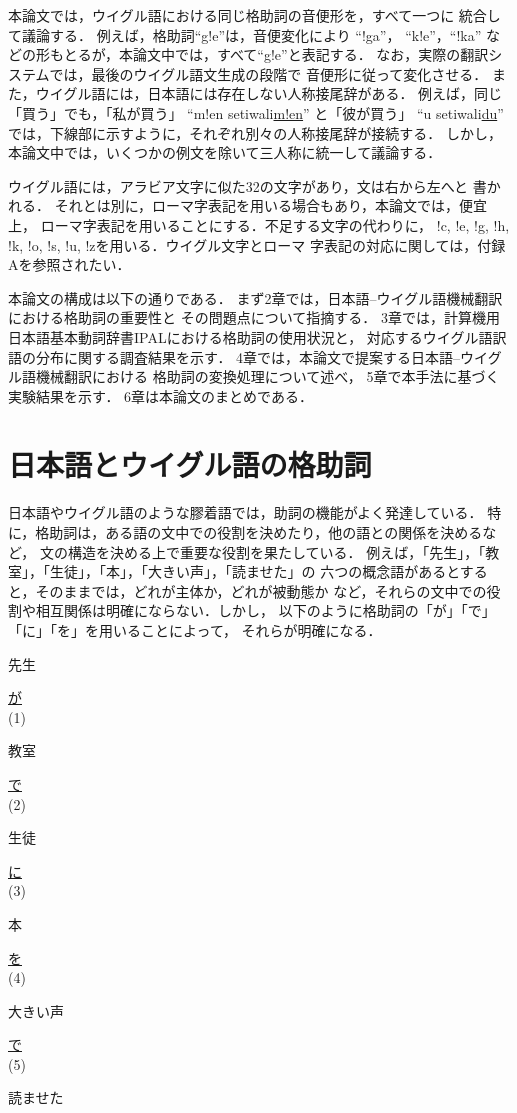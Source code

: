 本論文では，ウイグル語における同じ格助詞の音便形を，すべて一つに
統合して議論する．
例えば，格助詞``g!e''は，音便変化により ``!ga''， ``k!e''，``!ka''
などの形もとるが，本論文中では，すべて``g!e''と表記する．
なお，実際の翻訳システムでは，最後のウイグル語文生成の段階で
音便形に従って変化させる．
また，ウイグル語には，日本語には存在しない人称接尾辞がある．
例えば，同じ「買う」でも，「私が買う」 ``m!en setiwali\underline{m!en}''
と「彼が買う」 ``u setiwali\underline{du}''
では，下線部に示すように，それぞれ別々の人称接尾辞が接続する．
しかし，本論文中では，いくつかの例文を除いて三人称に統一して議論する．

ウイグル語には，アラビア文字に似た32の文字があり，文は右から左へと
書かれる．
それとは別に，ローマ字表記を用いる場合もあり，本論文では，便宜上，
ローマ字表記を用いることにする．不足する文字の代わりに，
!c, !e, !g, !h, !k, !o, !s, !u, !zを用いる．ウイグル文字とローマ
字表記の対応に関しては，付録Aを参照されたい．

本論文の構成は以下の通りである．
まず2章では，日本語--ウイグル語機械翻訳における格助詞の重要性と
その問題点について指摘する．
3章では，計算機用日本語基本動詞辞書IPAL\cite{IPAL}における格助詞の使用状況と，
対応するウイグル語訳語の分布に関する調査結果を示す．
4章では，本論文で提案する日本語--ウイグル語機械翻訳における
格助詞の変換処理について述べ，
5章で本手法に基づく実験結果を示す．
6章は本論文のまとめである．

\section{日本語とウイグル語の格助詞}\label{prrel}
日本語やウイグル語のような膠着語では，助詞の機能がよく発達している．
特に，格助詞は，ある語の文中での役割を決めたり，他の語との関係を決めるなど，
文の構造を決める上で重要な役割を果たしている．
例えば，「先生」，「教室」，「生徒」，「本」，「大きい声」，「読ませた」の
六つの概念語があるとすると，そのままでは，どれが主体か，どれが被動態か
など，それらの文中での役割や相互関係は明確にならない．しかし，
以下のように格助詞の「が」「で」「に」「を」を用いることによって，
それらが明確になる．
\begin{center}
先生\parbox[t]{3ex}{\underline{が}\vspace{-1ex}\\{\footnotesize (1)}}
教室\parbox[t]{3ex}{\underline{で}\vspace{-1ex}\\ {\footnotesize (2)}}
生徒\parbox[t]{3ex}{\underline{に}\vspace{-1ex}\\ {\footnotesize (3)}}
本\parbox[t]{3ex}{\underline{を}\vspace{-1ex}\\ {\footnotesize (4)}}
大きい声\parbox[t]{3ex}{\underline{で}\vspace{-1ex}\\ {\footnotesize (5)}}読ませた
\end{center}


